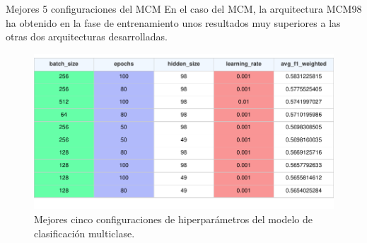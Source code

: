 \begin{frame}{Mejores 5 configuraciones del MCM}
En el caso del MCM, la arquitectura MCM98 ha obtenido en la fase de entrenamiento unos resultados muy superiores a las otras dos arquitecturas desarrolladas.
\begin{figure}[H]
    \centering
    \includegraphics[width=1\textwidth]{../Memoria/img/modelo/resultados/MULtop10.pdf}
    \caption{Mejores cinco configuraciones de hiperparámetros del modelo de clasificación multiclase.}
    \label{fig:BINtop5}
\end{figure}

\end{frame}





























